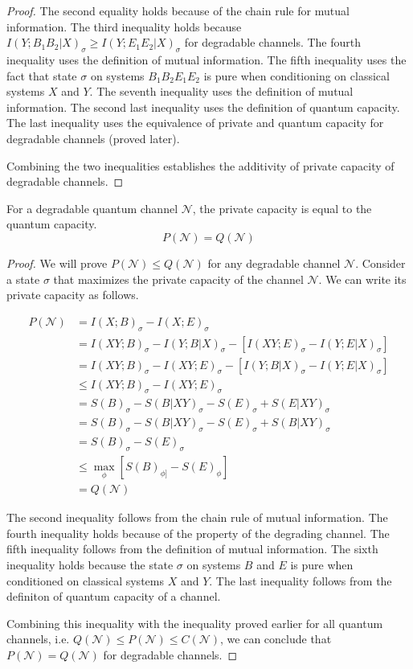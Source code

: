 \begin{proof}
The second equality holds because of the chain rule for mutual information. The third inequality holds because $I(Y; B_1B_2|X)_\sigma \geq I(Y; E_1E_2|X)_\sigma$ for degradable channels. The fourth inequality uses the definition of mutual information. The fifth inequality uses the fact that state $\sigma$ on systems $B_1B_2E_1E_2$ is pure when conditioning on classical systems $X$ and $Y$. The seventh inequality uses the definition of mutual information. The second last inequality uses the definition of quantum capacity. The last inequality uses the equivalence of private and quantum capacity for degradable channels (proved later).

Combining the two inequalities establishes the additivity of private capacity of degradable channels.
\end{proof}

\begin{theorem}
For a degradable quantum channel $\mathcal{N}$, the private capacity is equal to the quantum capacity.
$$P(\mathcal{N}) = Q(\mathcal{N})$$
\end{theorem}

\begin{proof}
We will prove $P(\mathcal{N}) \leq Q(\mathcal{N})$ for any degradable channel $\mathcal{N}$. Consider a state $\sigma$ that maximizes the private capacity of the channel $\mathcal{N}$. We can write its private capacity as follows.

\begin{align*}
P(\mathcal{N}) &= I(X;B)_{\sigma} - I(X;E)_{\sigma} \\
&= I(XY;B)_{\sigma} - I(Y;B|X)_{\sigma} - [I(XY;E)_{\sigma} - I(Y;E|X)_{\sigma}] \\
&= I(XY;B)_{\sigma} - I(XY;E)_{\sigma} - [I(Y;B|X)_{\sigma} - I(Y;E|X)_{\sigma}] \\
&\leq I(XY;B)_{\sigma} - I(XY;E)_{\sigma} \\
&= S(B)_{\sigma} - S(B|XY)_{\sigma} - S(E)_{\sigma} + S(E|XY)_{\sigma} \\
&= S(B)_{\sigma} - S(B|XY)_{\sigma} - S(E)_{\sigma} + S(B|XY)_{\sigma} \\
&= S(B)_{\sigma} - S(E)_{\sigma} \\
&\leq \max_\phi \left[ S(B)_{\phi]} - S(E)_{\phi} \right] \\
&= Q(\mathcal{N})
\end{align*}

The second inequality follows from the chain rule of mutual information. The fourth inequality holds because of the property of the degrading channel. The fifth inequality follows from the definition of mutual information. The sixth inequality holds because the state $\sigma$ on
systems $B$ and $E$ is pure when conditioned on classical systems $X$ and $Y$. The last inequality follows from the definiton of quantum capacity of a channel.

Combining this inequality with the inequality proved earlier for all quantum channels, i.e. $Q(\mathcal{N}) \leq P(\mathcal{N}) \leq C(\mathcal{N})$, we can conclude that $P(\mathcal{N}) = Q(\mathcal{N})$ for degradable channels.
\end{proof}
